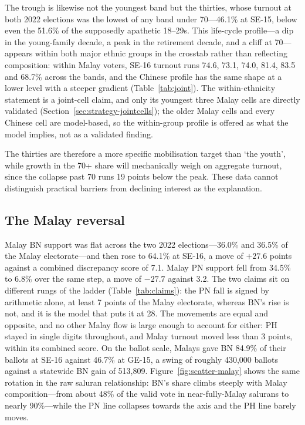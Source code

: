 \documentclass[11pt]{article}
\begin{document}
The trough is likewise not the youngest band but the thirties, whose turnout at both 2022 elections was the lowest of any band under 70---46.1\% at SE-15, below even the 51.6\% of the supposedly apathetic 18--29s. This life-cycle profile---a dip in the young-family decade, a peak in the retirement decade, and a cliff at 70---appears within both major ethnic groups in the crosstab rather than reflecting composition: within Malay voters, SE-16 turnout runs 74.6, 73.1, 74.0, 81.4, 83.5 and 68.7\% across the bands, and the Chinese profile has the same shape at a lower level with a steeper gradient (Table~\ref{tab:joint}). The within-ethnicity statement is a joint-cell claim, and only its youngest three Malay cells are directly validated (Section~\ref{sec:strategy-jointcells}); the older Malay cells and every Chinese cell are model-based, so the within-group profile is offered as what the model implies, not as a validated finding.

The thirties are therefore a more specific mobilisation target than `the youth', while growth in the 70+ share will mechanically weigh on aggregate turnout, since the collapse past 70 runs 19 points below the peak. These data cannot distinguish practical barriers from declining interest as the explanation.

\subsection{The Malay reversal}
\label{sec:findings-malay}

Malay BN support was flat across the two 2022 elections---36.0\% and 36.5\% of the Malay electorate---and then rose to 64.1\% at SE-16, a move of $+27.6$ points against a combined discrepancy score of 7.1. Malay PN support fell from 34.5\% to 6.8\% over the same step, a move of $-27.7$ against 3.2. The two claims sit on different rungs of the ladder (Table~\ref{tab:claims}): the PN fall is signed by arithmetic alone, at least 7 points of the Malay electorate, whereas BN's rise is not, and it is the model that puts it at 28. The movements are equal and opposite, and no other Malay flow is large enough to account for either: PH stayed in single digits throughout, and Malay turnout moved less than 3 points, within its combined score. On the ballot scale, Malays gave BN 84.9\% of their ballots at SE-16 against 46.7\% at GE-15, a swing of roughly 430,000 ballots against a statewide BN gain of 513,809. Figure~\ref{fig:scatter-malay} shows the same rotation in the raw saluran relationship: BN's share climbs steeply with Malay composition---from about 48\% of the valid vote in near-fully-Malay salurans to nearly 90\%---while the PN line collapses towards the axis and the PH line barely moves.
\end{document}
